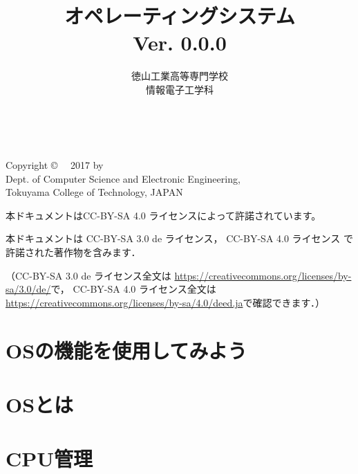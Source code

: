 \documentclass[a4paper,11pt,twocolumn]{ltjsbook}     %
\begin{document}
\frontmatter
\title{オペレーティングシステム\\Ver. 0.0.0}
\author{徳山工業高等専門学校\\情報電子工学科}
\date{}
\maketitle

\thispagestyle{empty}
\onecolumn
~
\vfill
\begin{flushleft}
Copyright \copyright ~~ 2017 by \\
Dept. of Computer Science and Electronic Engineering, \\
Tokuyama College of Technology, JAPAN
\end{flushleft}

\vspace{0.8cm}
本ドキュメントはCC-BY-SA 4.0 ライセンスによって許諾されています。

本ドキュメントは
CC-BY-SA 3.0 de ライセンス，
CC-BY-SA 4.0 ライセンス
で許諾された著作物を含みます．

（CC-BY-SA 3.0 de ライセンス全文は
\url{https://creativecommons.org/licenses/by-sa/3.0/de/}で，
CC-BY-SA 4.0 ライセンス全文は
\url{https://creativecommons.org/licenses/by-sa/4.0/deed.ja}で確認できます．）

\setcounter{tocdepth}{2}
\tableofcontents

\mainmatter

\part{OSの機能を使用してみよう}

\part{OSとは}
\part{CPU管理}
\end{document}
